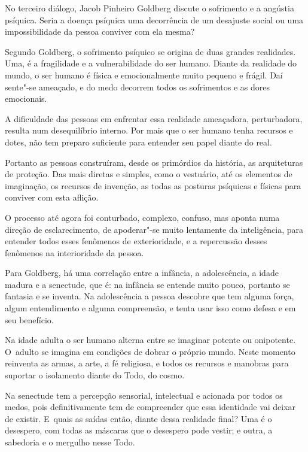  

No terceiro diálogo, Jacob Pinheiro Goldberg discute o sofrimento e a
angústia psíquica. Seria a doença psíquica uma decorrência de um
desajuste social ou uma impossibilidade da pessoa conviver com ela
mesma?

Segundo Goldberg, o sofrimento psíquico se origina de duas grandes
realidades. Uma, é a fragilidade e a vulnerabilidade do ser humano.
Diante da realidade do mundo, o ser humano é física e emocionalmente
muito pequeno e frágil. Daí sente"-se ameaçado, e do medo decorrem todos
os sofrimentos e as dores emocionais.

A dificuldade das pessoas em enfrentar essa realidade ameaçadora,
perturbadora, resulta num desequilíbrio interno. Por mais que o ser
humano tenha recursos e dotes, não tem preparo suficiente para entender
seu papel diante do real.

Portanto as pessoas construíram, desde os primórdios da história, as
arquiteturas de proteção. Das mais diretas e simples, como o vestuário,
até os elementos de imaginação, os recursos de invenção, as todas as
posturas psíquicas e físicas para conviver com esta aflição.

O processo até agora foi conturbado, complexo, confuso, mas aponta numa
direção de esclarecimento, de apoderar"-se muito lentamente da
inteligência, para entender todos esses fenômenos de exterioridade, e a
repercussão desses fenômenos na interioridade da pessoa.

Para Goldberg, há uma correlação entre a infância, a adolescência, a
idade madura e a senectude, que é: na infância se entende muito pouco,
portanto se fantasia e se inventa. Na adolescência a pessoa descobre que
tem alguma força, algum entendimento e alguma compreensão, e tenta usar
isso como defesa e em seu benefício.

Na idade adulta o ser humano alterna entre se imaginar potente ou
onipotente. O~adulto se imagina em condições de dobrar o próprio mundo.
Neste momento reinventa as armas, a arte, a fé religiosa, e todos os
recursos e manobras para suportar o isolamento diante do Todo, do cosmo.

Na senectude tem a percepção sensorial, intelectual e acionada por todos
os medos, pois definitivamente tem de compreender que essa identidade
vai deixar de existir. E~quais as saídas então, diante dessa realidade
final? Uma é o desespero, com todas as máscaras que o desespero pode
vestir; e outra, a sabedoria e o mergulho nesse Todo.

